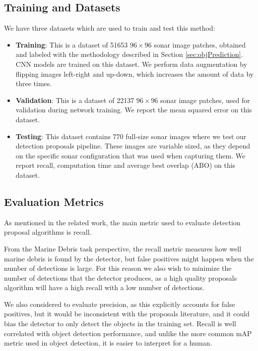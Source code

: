 \subsection{Training and Datasets}

We have three datasets which are used to train and test this method:

\begin{itemize}
	\item \textbf{Training}: This is a dataset of 51653 $96 \times 96$ sonar image patches, obtained and labeled with the methodology described in Section \ref{sec:objPrediction}. CNN models are trained on this dataset. We perform data augmentation by flipping images left-right and up-down, which increases the amount of data by three times.
	\item \textbf{Validation}: This is a dataset of 22137 $96 \times 96$ sonar image patches, used for validation during network training. We report the mean squared error on this dataset.
	\item \textbf{Testing}: This dataset contains 770 full-size sonar images where we test our detection proposals pipeline. These images are variable sized, as they depend on the specific sonar configuration that was used when capturing them. We report recall, computation time and average best overlap (ABO) on this dataset.
\end{itemize}

\subsection{Evaluation Metrics}

As mentioned in the related work, the main metric used to evaluate detection proposal algorithms is recall.

From the Marine Debris task perspective, the recall metric measures how well marine debris is found by the detector, but false positives might happen when the number of detections is large. For this reason we also wish to minimize the number of detections that the detector produces, as a high quality proposals algorithm will have a high recall with a low number of detections.

We also considered to evaluate precision, as this explicitly accounts for false positives, but it would be inconsistent with the proposals literature, and it could bias the detector to only detect the objects in the training set. Recall is well correlated \cite{hosang2016makes} with object detection performance, and unlike the more common mAP metric used in object detection, it is easier to interpret for a human.

